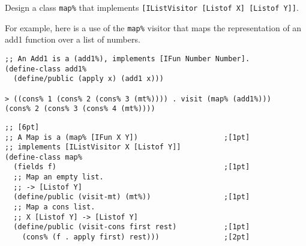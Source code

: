 \documentclass[12pt]{article}                   %
\newenvironment{solution}{}{}
\begin{document}
\begin{problem}
\begin{enumerate}
Design a class \verb|map%| that implements
\verb|[IListVisitor [Listof X] [Listof Y]]|.

For example, here is a use of the \verb|map%| visitor that maps the
representation of an add1 function over a list of numbers.

\begin{verbatim}
;; An Add1 is a (add1%), implements [IFun Number Number].
(define-class add1%
  (define/public (apply x) (add1 x)))

> ((cons% 1 (cons% 2 (cons% 3 (mt%)))) . visit (map% (add1%)))
(cons% 2 (cons% 3 (cons% 4 (mt%)))) 
\end{verbatim}

\begin{solution}
\begin{verbatim}
;; [6pt]
;; A Map is a (map% [IFun X Y])                    ;[1pt] 
;; implements [IListVisitor X [Listof Y]] 
(define-class map%
  (fields f)                                       ;[1pt] 
  ;; Map an empty list.
  ;; -> [Listof Y]
  (define/public (visit-mt) (mt%))                 ;[1pt] 
  ;; Map a cons list.
  ;; X [Listof Y] -> [Listof Y]
  (define/public (visit-cons first rest)           ;[1pt] 
    (cons% (f . apply first) rest)))               ;[2pt] 
\end{verbatim}
\end{solution}

\end{enumerate}

\ifrubric{}
\newpage
\fi
\end{problem}

\end{document}
